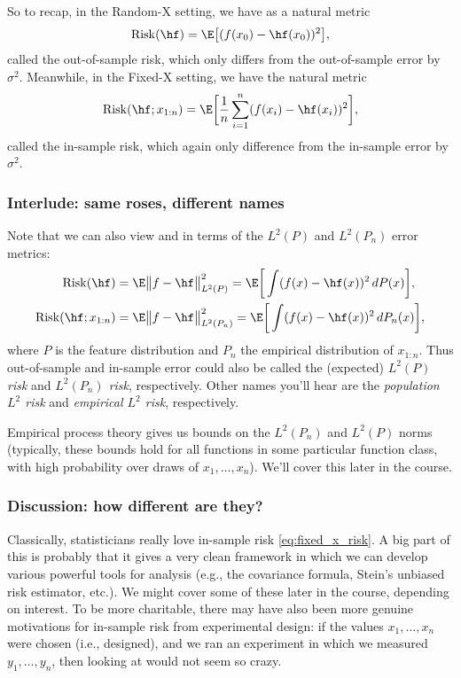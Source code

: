 \documentclass{article}
\begin{document}
So to recap, in the Random-X setting, we have as a natural metric  
\begin{equation}
\label{eq:random_x_risk}
\Risk(\hf) = \E\big[ (f(x_0) - \hf(x_0))^2 \big],
\end{equation}
called the out-of-sample risk, which only differs from the out-of-sample error
by $\sigma^2$. Meanwhile, in the Fixed-X setting, we have the natural metric 
\begin{equation}
\label{eq:fixed_x_risk}
\Risk(\hf; x_{1:n}) = \E\bigg[ \frac{1}{n}\sum_{i=1}^n (f(x_i) - \hf(x_i))^2
\bigg], 
\end{equation}
called the in-sample risk, which again only difference from the in-sample error
by $\sigma^2$.

\subsubsection{Interlude: same roses, different names}

Note that we can also view \smash{$\Risk(\hf)$} and  in terms of the $L^2(P)$ and $L^2(P_n)$ error metrics:
\begin{align*}
\Risk(\hf) &= \E \big\|f - \hf\big\|_{L^2(P)}^2 
= \E\bigg[ \int (f(x) - \hf(x))^2 \, dP(x) \bigg], \\
\Risk(\hf; x_{1:n}) &= \E \big\|f - \hf\big\|_{L^2(P_n)}^2  
= \E\bigg[ \int (f(x) - \hf(x))^2 \, dP_n(x) \bigg],
\end{align*}
where $P$ is the feature distribution and $P_n$ the empirical distribution of
$x_{1:n}$. Thus out-of-sample and in-sample error could also be called the
(expected) \emph{$L^2(P)$ risk} and \emph{$L^2(P_n)$ risk},
respectively. Other names you'll hear are the \emph{population $L^2$ risk} and
\emph{empirical $L^2$ risk}, respectively.    

Empirical process theory gives us bounds on the $L^2(P_n)$ and $L^2(P)$ norms
(typically, these bounds hold for all functions in some particular function
class, with high probability over draws of $x_1,\dots,x_n$). We'll cover this
later in the course.    

\subsubsection{Discussion: how different are they?}

Classically, statisticians really love in-sample risk \eqref{eq:fixed_x_risk}. A
big part of this is probably that it gives a very clean framework in which we
can develop various powerful tools for analysis (e.g., the covariance formula,
Stein's unbiased risk estimator, etc.). We might cover some of these later in
the course, depending on interest. To be more charitable, there may have also
been more genuine motivations for in-sample risk from experimental design: if
the values $x_1,\dots,x_n$ were chosen (i.e., designed), and we ran an
experiment in which we measured $y_1,\dots,y_n$, then looking at
 would not seem so crazy.  
\end{document}
